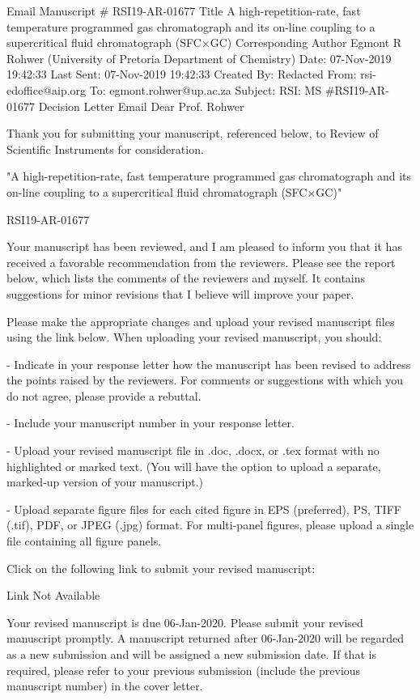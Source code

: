 
Email
Manuscript #	RSI19-AR-01677
Title	A high-repetition-rate, fast temperature programmed gas chromatograph and its on-line coupling to a supercritical fluid chromatograph (SFC×GC)
Corresponding Author	Egmont R Rohwer (University of Pretoria Department of Chemistry)
Date:	07-Nov-2019 19:42:33
Last Sent:	07-Nov-2019 19:42:33
Created By:	Redacted
From:	rsi-edoffice@aip.org
To:	egmont.rohwer@up.ac.za
Subject:	RSI: MS #RSI19-AR-01677 Decision Letter
Email	Dear Prof. Rohwer

Thank you for submitting your manuscript, referenced below, to Review of Scientific Instruments for consideration.

"A high-repetition-rate, fast temperature programmed gas chromatograph and its on-line coupling to a supercritical fluid chromatograph (SFC×GC)"

RSI19-AR-01677

Your manuscript has been reviewed, and I am pleased to inform you that it has received a favorable recommendation from the reviewers. Please see the report below, which lists the comments of the reviewers and myself. It contains suggestions for minor revisions that I believe will improve your paper.

Please make the appropriate changes and upload your revised manuscript files using the link below. When uploading your revised manuscript, you should:

- Indicate in your response letter how the manuscript has been revised to
address the points raised by the reviewers. For comments or suggestions with
which you do not agree, please provide a rebuttal.

- Include your manuscript number in your response letter.

- Upload your revised manuscript file in .doc, .docx, or .tex format with no
highlighted or marked text. (You will have the option to upload a separate,
marked-up version of your manuscript.)

- Upload separate figure files for each cited figure in EPS (preferred), PS,
TIFF (.tif), PDF, or JPEG (.jpg) format. For multi-panel figures, please upload
a single file containing all figure panels.

Click on the following link to submit your revised manuscript:

Link Not Available

Your revised manuscript is due 06-Jan-2020. Please submit your revised manuscript promptly. A manuscript returned after 06-Jan-2020 will be regarded as a new submission and will be assigned a new submission date. If that is required, please refer to your previous submission (include the previous manuscript number) in the cover letter.


